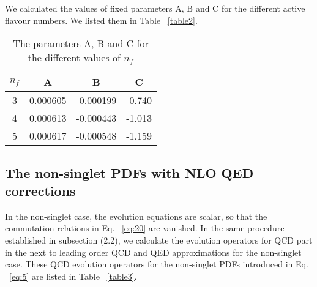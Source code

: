 \documentclass[review]{elsarticle}
\begin{document}
We calculated the values of fixed parameters A, B and C for the different active flavour numbers. We listed them in Table ~\eqref{table2}.
%
\begin{table}[H]
\centering{}\caption{The parameters A, B and C for the different values of $n_{f}$}
\begin{tabular}{cccc}
\hline 
$n_{f}$ & A & B & C\tabularnewline
\hline 
\hline 
3 & 0.000605 & -0.000199 & -0.740\tabularnewline
\hline 
4 & 0.000613 & -0.000443 & -1.013\tabularnewline
\hline 
5 & 0.000617 & -0.000548 & -1.159\tabularnewline
\hline 
\end{tabular}\label{table2}
\end{table}

%
\subsection{The non-singlet PDFs with NLO QED corrections}
In the non-singlet case, the evolution equations are scalar, so that the
commutation relations in Eq. ~\eqref{eq:20} are vanished.  In the same procedure established in subsection (2.2), we calculate the evolution operators for QCD part in the next to leading order QCD and QED approximations for the non-singlet case. These QCD evolution operators for the non-singlet PDFs introduced in Eq. ~\eqref{eq:5} are listed in Table ~\eqref{table3}.
\\
\end{document}

